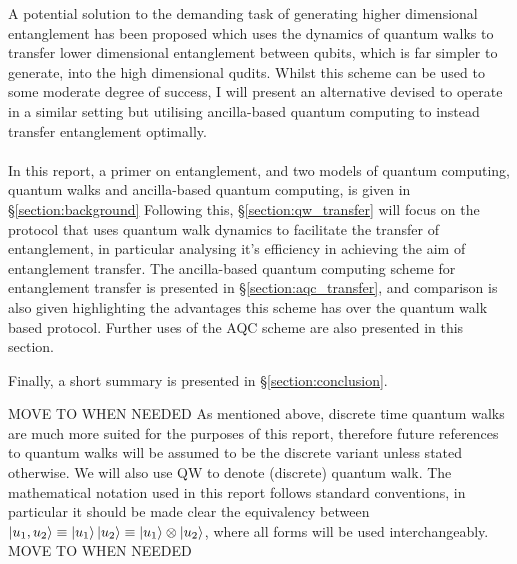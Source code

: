 A potential solution to the demanding task of generating higher dimensional entanglement has been proposed \cite{giordani2020} which uses the dynamics of quantum walks to transfer lower dimensional entanglement between qubits, which is far simpler to generate, into the high dimensional qudits. 
Whilst this scheme can be used to some moderate degree of success, I will present an alternative devised to operate in a similar setting but utilising ancilla-based quantum computing to instead transfer entanglement optimally.\paragraph{}

In this report, a primer on entanglement, and two models of quantum computing, quantum walks and ancilla-based quantum computing, is given in \S{\ref{section:background}}
Following this, \S{\ref{section:qw_transfer}} will focus on the protocol that uses quantum walk dynamics to facilitate the transfer of entanglement, in particular analysing it's efficiency in achieving the aim of entanglement transfer. The ancilla-based quantum computing scheme for entanglement transfer is presented in \S{\ref{section:aqc_transfer}}, and comparison is also given highlighting the advantages this scheme has over the quantum walk based protocol. Further uses of the AQC scheme are also presented in this section.

Finally, a short summary is presented in \S{\ref{section:conclusion}}.\newline

MOVE TO WHEN NEEDED
As mentioned above, discrete time quantum walks are much more suited for the purposes of this report, therefore future references to quantum walks will be assumed to be the discrete variant unless stated otherwise. 
We will also use QW to denote (discrete) quantum walk. 
The mathematical notation used in this report follows standard conventions, in particular it should be made clear the equivalency between $\ket{u_1, u_2}\equiv\ket{u_1}\ket{u_2} \equiv \ket{u_1} \otimes \ket{u_2}$, where all forms will be used interchangeably.
MOVE TO WHEN NEEDED